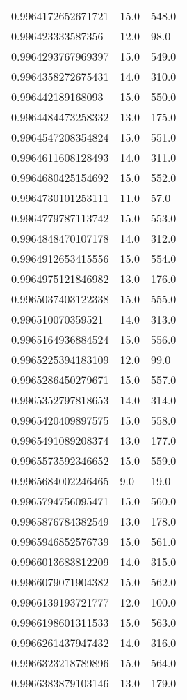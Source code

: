 \begin{center}
\begin{supertabular}[H]{p{0.30\textwidth}p{0.05\textwidth}p{0.05\textwidth}}
0.9964172652671721 & 15.0 & 548.0 \\ 
0.996423333587356 & 12.0 & 98.0 \\ 
0.9964293767969397 & 15.0 & 549.0 \\ 
0.9964358272675431 & 14.0 & 310.0 \\ 
0.996442189168093 & 15.0 & 550.0 \\ 
0.9964484473258332 & 13.0 & 175.0 \\ 
0.9964547208354824 & 15.0 & 551.0 \\ 
0.9964611608128493 & 14.0 & 311.0 \\ 
0.9964680425154692 & 15.0 & 552.0 \\ 
0.9964730101253111 & 11.0 & 57.0 \\ 
0.9964779787113742 & 15.0 & 553.0 \\ 
0.9964848470107178 & 14.0 & 312.0 \\ 
0.9964912653415556 & 15.0 & 554.0 \\ 
0.9964975121846982 & 13.0 & 176.0 \\ 
0.9965037403122338 & 15.0 & 555.0 \\ 
0.996510070359521 & 14.0 & 313.0 \\ 
0.9965164936884524 & 15.0 & 556.0 \\ 
0.9965225394183109 & 12.0 & 99.0 \\ 
0.9965286450279671 & 15.0 & 557.0 \\ 
0.9965352797818653 & 14.0 & 314.0 \\ 
0.9965420409897575 & 15.0 & 558.0 \\ 
0.9965491089208374 & 13.0 & 177.0 \\ 
0.9965573592346652 & 15.0 & 559.0 \\ 
0.9965684002246465 & 9.0 & 19.0 \\ 
0.9965794756095471 & 15.0 & 560.0 \\ 
0.9965876784382549 & 13.0 & 178.0 \\ 
0.9965946852576739 & 15.0 & 561.0 \\ 
0.9966013683812209 & 14.0 & 315.0 \\ 
0.9966079071904382 & 15.0 & 562.0 \\ 
0.9966139193721777 & 12.0 & 100.0 \\ 
0.9966198601311533 & 15.0 & 563.0 \\ 
0.9966261437947432 & 14.0 & 316.0 \\ 
0.9966323218789896 & 15.0 & 564.0 \\ 
0.9966383879103146 & 13.0 & 179.0 \\ 

\end{supertabular}
\end{center}
